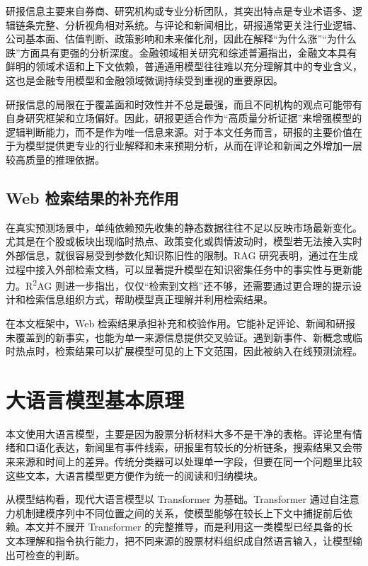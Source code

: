 研报信息主要来自券商、研究机构或专业分析团队，其突出特点是专业术语多、逻辑链条完整、分析视角相对系统。与评论和新闻相比，研报通常更关注行业逻辑、公司基本面、估值判断、政策影响和未来催化剂，因此在解释“为什么涨”“为什么跌”方面具有更强的分析深度。金融领域相关研究和综述普遍指出，金融文本具有鲜明的领域术语和上下文依赖，普通通用模型往往难以充分理解其中的专业含义，这也是金融专用模型和金融领域微调持续受到重视的重要原因\cite{araci2019finbert,lee2024finllms,li2023llmfinance,nie2024llmfinancialapplications,wu2023bloomberggpt}。

研报信息的局限在于覆盖面和时效性并不总是最强，而且不同机构的观点可能带有自身研究框架和立场偏好。因此，研报更适合作为“高质量分析证据”来增强模型的逻辑判断能力，而不是作为唯一信息来源。对于本文任务而言，研报的主要价值在于为模型提供更专业的行业解释和未来预期分析，从而在评论和新闻之外增加一层较高质量的推理依据。

\subsection{Web 检索结果的补充作用}

在真实预测场景中，单纯依赖预先收集的静态数据往往不足以反映市场最新变化。尤其是在个股或板块出现临时热点、政策变化或舆情波动时，模型若无法接入实时外部信息，就很容易受到参数化知识陈旧性的限制。RAG 研究表明，通过在生成过程中接入外部检索文档，可以显著提升模型在知识密集任务中的事实性与更新能力\cite{lewis2020rag}。R\textsuperscript{2}AG 则进一步指出，仅仅“检索到文档”还不够，还需要通过更合理的提示设计和检索信息组织方式，帮助模型真正理解并利用检索结果\cite{ye2024r2ag}。

在本文框架中，Web 检索结果承担补充和校验作用。它能补足评论、新闻和研报未覆盖到的新事实，也能为单一来源信息提供交叉验证。遇到新事件、新概念或临时热点时，检索结果可以扩展模型可见的上下文范围，因此被纳入在线预测流程。

\section{大语言模型基本原理}

本文使用大语言模型，主要是因为股票分析材料大多不是干净的表格。评论里有情绪和口语化表达，新闻里有事件线索，研报里有较长的分析链条，搜索结果又会带来来源和时间上的差异。传统分类器可以处理单一字段，但要在同一个问题里比较这些文本，大语言模型更方便作为统一的阅读和归纳模块。

从模型结构看，现代大语言模型以 Transformer 为基础。Transformer 通过自注意力机制建模序列中不同位置之间的关系，使模型能够在较长上下文中捕捉前后依赖\cite{vaswani2017attention}。本文并不展开 Transformer 的完整推导，而是利用这一类模型已经具备的长文本理解和指令执行能力，把不同来源的股票材料组织成自然语言输入，让模型输出可检查的判断。

